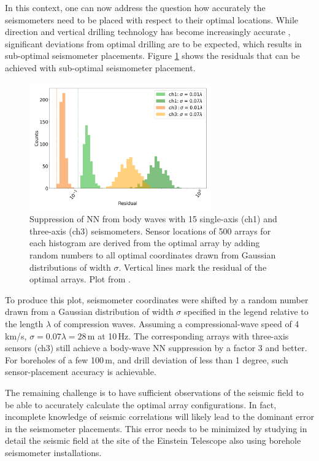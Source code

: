 In this context, one can now address the question how accurately the seismometers need to be placed with respect to their optimal locations. While direction and vertical drilling technology has become increasingly accurate \cite{MCZ2016}, significant deviations from optimal drilling are to be expected, which results in sub-optimal seismometer placements. Figure \ref{fig:errorNN} shows the residuals that can be achieved with sub-optimal seismometer placement. 
\begin{figure}[t!]
	\begin{center} 
		\includegraphics[width=0.7\textwidth]{./Detector/NewtonianNoise/NewtonianNoiseFigures/errorbody.png} 
		\caption{Suppression of NN from body waves with 15 single-axis (ch1) and three-axis (ch3) seismometers. Sensor locations of 500 arrays for each histogram are derived from the optimal array by adding random numbers to all optimal coordinates drawn from Gaussian distributions of width $\sigma$. Vertical lines mark the residual of the optimal arrays. Plot from \cite{BaHa2019}.} 
		 \label{fig:errorNN} 
	\end{center}
\end{figure}
To produce this plot, seismometer coordinates were shifted by a random number drawn from a Gaussian distribution of width $\sigma$ specified in the legend relative to the length $\lambda$ of compression waves. Assuming a compressional-wave speed of 4\,km/s, $\sigma=0.07\lambda=28\,$m at 10\,Hz. The corresponding arrays with three-axis sensors (ch3) still achieve a body-wave NN suppression by a factor 3 and better. For boreholes of a few 100\,m, and drill deviation of less than 1 degree, such sensor-placement accuracy is achievable. 

The remaining challenge is to have sufficient observations of the seismic field to be able to accurately calculate the optimal array configurations. In fact, incomplete knowledge of seismic correlations will likely lead to the dominant error in the seismometer placements. This error needs to be minimized by studying in detail the seismic field at the site of the Einstein Telescope also using borehole seismometer installations.

